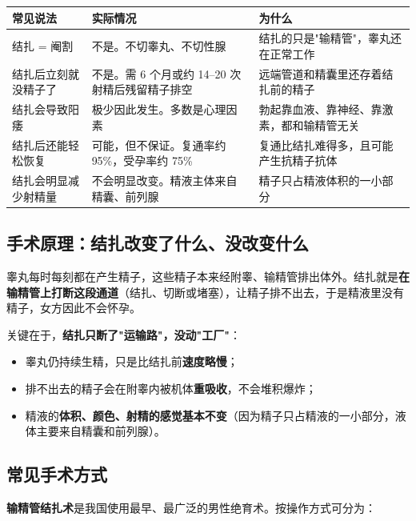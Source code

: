 \documentclass[12pt,UTF8,openany]{ctexbook}
\begin{document}
\begin{center}
\renewcommand{\arraystretch}{1.3}
\begin{tabularx}{\textwidth}{|X|X|X|}
\hline
\textbf{常见说法} & \textbf{实际情况} & \textbf{为什么} \\
\hline
结扎 = 阉割 & 不是。不切睾丸、不切性腺 & 结扎的只是"输精管"，睾丸还在正常工作 \\
结扎后立刻就没精子了 & 不是。需 6 个月或约 14–20 次射精后残留精子排空 & 远端管道和精囊里还存着结扎前的精子 \\
结扎会导致阳痿 & 极少因此发生。多数是心理因素 & 勃起靠血液、靠神经、靠激素，都和输精管无关 \\
结扎后还能轻松恢复 & 可能，但不保证。复通率约 95\%，受孕率约 75\% & 复通比结扎难得多，且可能产生抗精子抗体 \\
结扎会明显减少射精量 & 不会明显改变。精液主体来自精囊、前列腺 & 精子只占精液体积的一小部分 \\
\hline
\end{tabularx}
\end{center}

\subsection*{手术原理：结扎改变了什么、没改变什么}

睾丸每时每刻都在产生精子，这些精子本来经附睾、输精管排出体外。结扎就是\textbf{在输精管上打断这段通道}（结扎、切断或堵塞），让精子排不出去，于是精液里没有精子，女方因此不会怀孕。

关键在于，\textbf{结扎只断了"运输路"，没动"工厂"}：

\begin{itemize}
  \item 睾丸仍持续生精，只是比结扎前\textbf{速度略慢}；
  \item 排不出去的精子会在附睾内被机体\textbf{重吸收}，不会堆积爆炸；
  \item 精液的\textbf{体积、颜色、射精的感觉基本不变}（因为精子只占精液的一小部分，液体主要来自精囊和前列腺）。
\end{itemize}

\subsection*{常见手术方式}

\textbf{输精管结扎术}是我国使用最早、最广泛的男性绝育术。按操作方式可分为：
\end{document}
